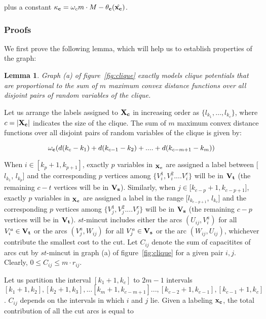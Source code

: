 \documentclass[10pt,letterpaper]{article}
\newtheorem{lemma}{Lemma}
\begin{document}
plus a constant ${\bf \kappa}_{\bf c} = \omega_c m \cdot M - \theta_{\bf c}(\hat{{\bf x}_{\bf c}})$.



\subsubsection{Proofs}

We first prove the following lemma, which will help us to establish properties of the graph:

\begin{lemma}
Graph (a) of figure~\ref{fig:clique} exactly models clique potentials that are proportional to the sum of $m$ maximum convex distance functions over all disjoint pairs of random variables of the clique.
\label{lemma:cliqueGraphProof}
\end{lemma}
Let us arrange the labels assigned to $\bf{X_c}$ in increasing order as $\{l_{k_{1}}, \dots ,l_{k_{c}}\}$, where $c = |\bf{X_c}|$ indicates the size of the clique. The sum of $m$ maximum convex distance functions over all disjoint pairs of random variables of the clique is given by:

\begin{equation}
\omega_{\bf c}(d(k_{c} - k_{1}) + d(k_{c-1} - k_{2}) + .... + d(k_{c-m+1} - k_{m}))
\end{equation}

When $i \in [k_{p} + 1, k_{p + 1}]$, exactly $p$ variables in ${\bf_{X_c}}$ are assigned a label between [$l_{k_{1}}$, $l_{k_{p}}$] and the corresponding $p$ vertices among $\{V^1_i, V^2_i....V^c_i\}$ will be in $\bf{V}_{t}$ (the remaining $c-t$ vertices will be in $\bf{V}_{s}$). Similarly, when $j \in [k_{c-p} + 1, k_{c-p+1}$], exactly $p$ variables in ${\bf_{X_c}}$ are assigned a label in the range [$l_{k_{c - p + 1}}$, $l_{k_{c}}$] and the corresponding $p$ vertices among $\{V^1_j, V^2_j....V^c_j\}$ will be in $\bf{V}_{s}$ (the remaining $c-p$ vertices will be in $\bf{V}_{t}$). $st$-{\sc mincut} includes either the arcs $(U_{ij}, V_{i}^{a})$ for all $V_{i}^{a} \in \bf{V}_{t}$ or the arcs $(V_{j}^{a}, W_{ij})$ for all $V_{j}^{a} \in \bf{V}_{s}$ or the arc $(W_{ij}, U_{ij})$, whichever contribute the smallest cost to the cut. Let $C_{ij}$ denote the sum of capacitites of arcs cut by $st$-{\sc mincut} in graph (a) of figure~\ref{fig:clique} for a given pair $i, j$. Clearly, $ 0 \leq C_{ij} \leq m \cdot r_{ij}$.

Let us partition the interval $[k_{1}+1, k_{c}]$ to $2m-1$ intervals $[k_{1}+1, k_{2}], [k_{2}+1, k_{3}],...[k_{m}+1, k_{c-m+1}]...,[k_{c-2}+1, k_{c-1}], [k_{c-1}+1, k_{c}] $. $C_{ij}$ depends on the intervals in which $i$ and $j$ lie. Given a labeling $\bf{x_{c}}$, the total contribution of all the cut arcs is equal to
\end{document}
